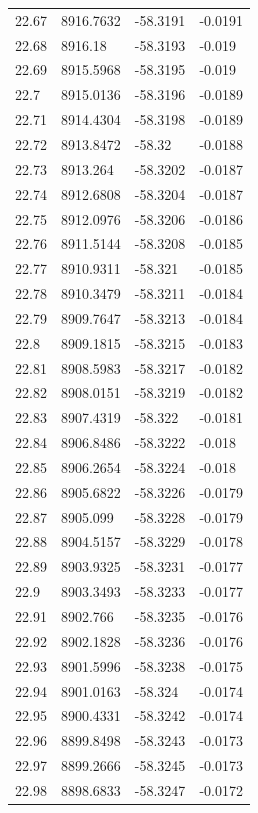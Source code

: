 \begin{table}[H]
\begin{tabular}{llll}
22.67 & 8916.7632 & -58.3191 & -0.0191 \\
22.68 & 8916.18 & -58.3193 & -0.019 \\
22.69 & 8915.5968 & -58.3195 & -0.019 \\
22.7 & 8915.0136 & -58.3196 & -0.0189 \\
22.71 & 8914.4304 & -58.3198 & -0.0189 \\
22.72 & 8913.8472 & -58.32 & -0.0188 \\
22.73 & 8913.264 & -58.3202 & -0.0187 \\
22.74 & 8912.6808 & -58.3204 & -0.0187 \\
22.75 & 8912.0976 & -58.3206 & -0.0186 \\
22.76 & 8911.5144 & -58.3208 & -0.0185 \\
22.77 & 8910.9311 & -58.321 & -0.0185 \\
22.78 & 8910.3479 & -58.3211 & -0.0184 \\
22.79 & 8909.7647 & -58.3213 & -0.0184 \\
22.8 & 8909.1815 & -58.3215 & -0.0183 \\
22.81 & 8908.5983 & -58.3217 & -0.0182 \\
22.82 & 8908.0151 & -58.3219 & -0.0182 \\
22.83 & 8907.4319 & -58.322 & -0.0181 \\
22.84 & 8906.8486 & -58.3222 & -0.018 \\
22.85 & 8906.2654 & -58.3224 & -0.018 \\
22.86 & 8905.6822 & -58.3226 & -0.0179 \\
22.87 & 8905.099 & -58.3228 & -0.0179 \\
22.88 & 8904.5157 & -58.3229 & -0.0178 \\
22.89 & 8903.9325 & -58.3231 & -0.0177 \\
22.9 & 8903.3493 & -58.3233 & -0.0177 \\
22.91 & 8902.766 & -58.3235 & -0.0176 \\
22.92 & 8902.1828 & -58.3236 & -0.0176 \\
22.93 & 8901.5996 & -58.3238 & -0.0175 \\
22.94 & 8901.0163 & -58.324 & -0.0174 \\
22.95 & 8900.4331 & -58.3242 & -0.0174 \\
22.96 & 8899.8498 & -58.3243 & -0.0173 \\
22.97 & 8899.2666 & -58.3245 & -0.0173 \\
22.98 & 8898.6833 & -58.3247 & -0.0172 \\

\end{tabular}
\end{table}
